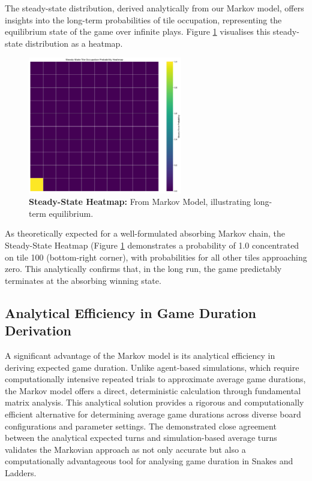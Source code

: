 The steady-state distribution, derived analytically from our Markov model, offers insights into the long-term probabilities of tile occupation, representing the equilibrium state of the game over infinite plays. Figure \ref{fig:steady_state_heatmap_chapter3} visualises this steady-state distribution as a heatmap.
\begin{figure}[ht]
	\centering
	\includegraphics[width=0.6\textwidth]{"../Markov Modelling/Data/SteadyStateHeatmap.png"}
	\caption{\textbf{Steady-State Heatmap:} From Markov Model, illustrating long-term equilibrium.}
	\label{fig:steady_state_heatmap_chapter3}
\end{figure}

As theoretically expected for a well-formulated absorbing Markov chain, the Steady-State Heatmap (Figure \ref{fig:steady_state_heatmap_chapter3} demonstrates a probability of 1.0 concentrated on tile 100 (bottom-right corner), with probabilities for all other tiles approaching zero. This analytically confirms that, in the long run, the game predictably terminates at the absorbing winning state.

\subsection{Analytical Efficiency in Game Duration Derivation}

A significant advantage of the Markov model is its analytical efficiency in deriving expected game duration. Unlike agent-based simulations, which require computationally intensive repeated trials to approximate average game durations, the Markov model offers a direct, deterministic calculation through fundamental matrix analysis. This analytical solution provides a rigorous and computationally efficient alternative for determining average game durations across diverse board configurations and parameter settings. The demonstrated close agreement between the analytical expected turns and simulation-based average turns validates the Markovian approach as not only accurate but also a computationally advantageous tool for analysing game duration in Snakes and Ladders.


